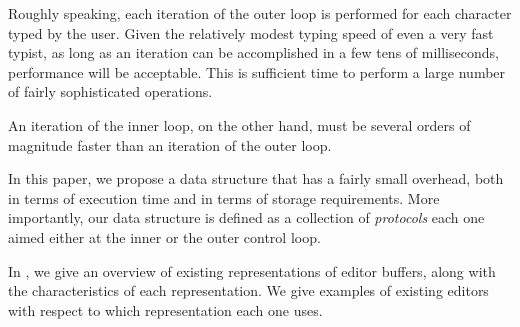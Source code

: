 Roughly speaking, each iteration of the outer loop is performed for
each character typed by the user.  Given the relatively modest typing
speed of even a very fast typist, as long as an iteration can be
accomplished in a few tens of milliseconds, performance will be
acceptable.  This is sufficient time to perform a large number of
fairly sophisticated operations.

An iteration of the inner loop, on the other hand, must be several
orders of magnitude faster than an iteration of the outer loop.

In this paper, we propose a data structure that has a fairly small
overhead, both in terms of execution time and in terms of storage
requirements.  More importantly, our data structure is defined as a
collection of \clos{} \emph{protocols} each one aimed either at the
inner or the outer control loop.

In , we give an overview of existing
representations of editor buffers, along with the characteristics of
each representation.  We give examples of existing editors with
respect to which representation each one uses.

